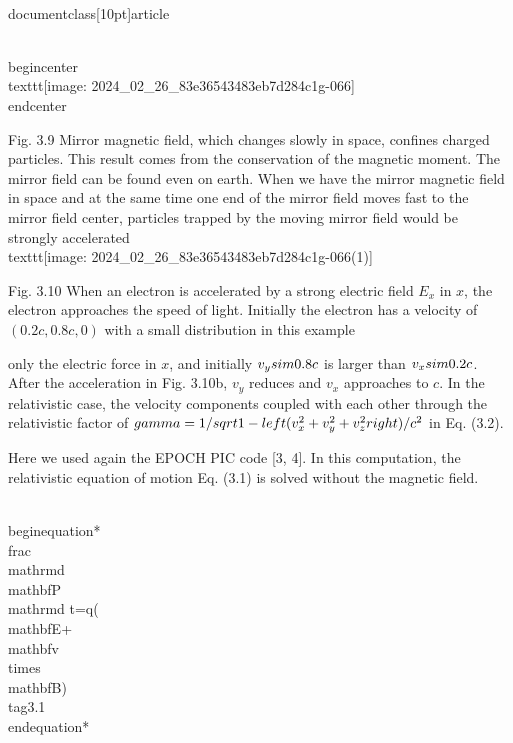 \\documentclass[10pt]{article}
\begin{document}
\\begin{center}
\\texttt{[image: 2024\_02\_26\_83e36543483eb7d284c1g-066]}
\\end{center}

Fig. 3.9 Mirror magnetic field, which changes slowly in space, confines charged particles. This result comes from the conservation of the magnetic moment. The mirror field can be found even on earth. When we have the mirror magnetic field in space and at the same time one end of the mirror field moves fast to the mirror field center, particles trapped by the moving mirror field would be strongly accelerated
\\texttt{[image: 2024\_02\_26\_83e36543483eb7d284c1g-066(1)]}

Fig. 3.10 When an electron is accelerated by a strong electric field $E_{x}$ in $x$, the electron approaches the speed of light. Initially the electron has a velocity of $(0.2 c, 0.8 c, 0)$ with a small distribution in this example

only the electric force in $x$, and initially $v_{y} \\sim 0.8 c$ is larger than $v_{x} \\sim 0.2 c$. After the acceleration in Fig. 3.10b, $v_{y}$ reduces and $v_{x}$ approaches to $c$. In the relativistic case, the velocity components coupled with each other through the relativistic factor of $\\gamma=1 / \\sqrt{1-\\left(v_{x}^{2}+v_{y}^{2}+v_{z}^{2}\\right) / c^{2}}$ in Eq. (3.2).

Here we used again the EPOCH PIC code [3, 4]. In this computation, the relativistic equation of motion Eq. (3.1) is solved without the magnetic field.


\\begin{equation*}
\\frac{\\mathrm{d} \\mathbf{P}}{\\mathrm{d} t}=q(\\mathbf{E}+\\mathbf{v} \\times \\mathbf{B}) \\tag{3.1}
\\end{equation*}
\end{document}
